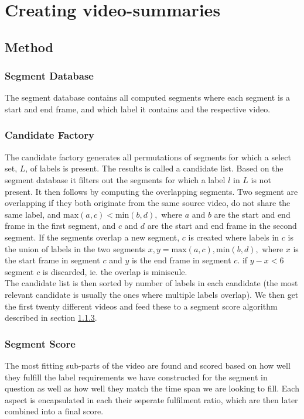 %
\chapter{Creating video-summaries}
%
\section{Method}
%

%
\subsection{Segment Database}
%
The segment database contains all computed segments where each segment is a start and end frame, and which label it contains and the respective video.
%
\subsection{Candidate Factory}
%
The candidate factory generates all permutations of segments for which a select set, $L$, of labels is present. The results is called a candidate list. Based on the segment database it filters out
the segments for which a label $l$ in $L$ is not present. It then follows by computing the overlapping segments. Two segment are overlapping if they both originate from the same source video, do not share the same label, and $\text{max}(a, c) < \text{min}(b, d),$ where $a$ and $b$ are the start and end frame in the first segment, and $c$ and $d$ are the start and end frame in the second segment. If the segments overlap a new segment, $c$ is created where labels in $c$ is the union of labels in the two segments $x,y = \text{max}(a, c), \text{min}(b, d),$ where $x$ is the start frame in segment $c$ and $y$ is the end frame in segment $c$. if $y-x < 6$ segment $c$ is discarded, ie. the overlap is miniscule.\\
The candidate list is then sorted by number of labels in each candidate (the most relevant candidate is usually the ones where multiple labels overlap). We then get the first twenty different videos and feed these to a segment score algorithm described in section \ref{sec:segment_score}.
%
\subsection{Segment Score}\label{sec:segment_score}
%
%
The most fitting sub-parts of the video are found and scored based on how well they fulfill the label requirements we have constructed for the segment in question as well as how well they match the time span we are looking to fill. Each aspect is encapsulated in each their seperate fulfilment ratio, which are then later combined into a final score.
%
%
%
